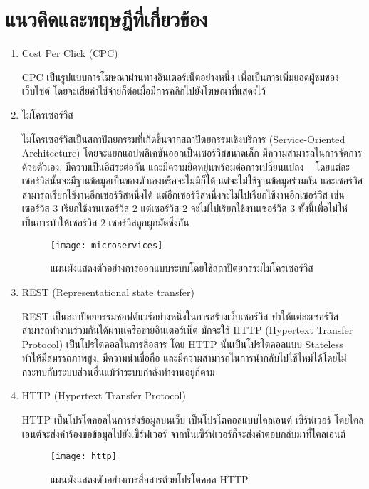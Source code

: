 \section{แนวคิดและทฤษฎีที่เกี่ยวข้อง}
\begin{enumerate}
	\item Cost Per Click (CPC)
	
	CPC เป็นรูปแบบการโฆษณาผ่านทางอินเตอร์เน็ตอย่างหนึ่ง เพื่อเป็นการเพิ่มยอดผู้ชมของเว็บไซต์  โดยจะเสียค่าใช้จ่ายก็ต่อเมื่อมีการคลิกไปยังโฆษณาที่แสดงไว้ ~\cite{cpc}
	
	\item ไมโครเซอร์วิส
	
	ไมโครเซอร์วิสเป็นสถาปัตยกรรมที่เกิดขึ้นจากสถาปัตยกรรมเชิงบริการ (Service-Oriented Architecture) โดยจะแยกแอปพลิเคชันออกเป็นเซอร์วิสขนาดเล็ก มีความสามารถในการจัดการด้วยตัวเอง, มีความเป็นอิสระต่อกัน และมีความยิดหยุ่นพร้อมต่อการเปลี่ยนแปลง ~\cite{microservices} โดยแต่ละเซอร์วิสนั้นจะมีฐานข้อมูลเป็นของตัวเองหรือจะไม่มีก็ได้ แต่จะไม่ใช้ฐานข้อมูลร่วมกัน และเซอร์วิสสามารถเรียกใช้งานอีกเซอร์วิสหนึ่งได้ แต่อีกเซอร์วิสหนึ่งจะไม่ไปเรียกใช้งานอีกเซอร์วิส เช่น เซอร์วิส 3 เรียกใช้งานเซอร์วิส 2 แต่เซอร์วิส 2 จะไม่ไปเรียกใช้งานเซอร์วิส 3 ทั้งนี้เพื่อไม่ให้เป็นการทำให้เซอร์วิส 2 เซอร์วิสถูกผูกมัดซึ่งกัน
	\begin{figure}[!h]
		\centering
		\texttt{[image: microservices]}  
		\caption{แผนผังแสดงตัวอย่างการออกแบบระบบโดยใช้สถาปัตยกรรมไมโครเซอร์วิส}
		\label{Fig:microservices}
	\end{figure}

	\item REST (Representational state transfer)

	REST เป็นสถาปัตยกรรมซอฟต์แวร์อย่างหนึ่งในการสร้างเว็บเซอร์วิส ทำให้แต่ละเซอร์วิสสามารถทำงานร่วมกันได้ผ่านเครือข่ายอินเตอร์เน็ต มักจะใช้ HTTP (Hypertext Transfer Protocol) เป็นโปรโตคอลในการสื่อสาร โดย HTTP นั้นเป็นโปรโตคอลแบบ Stateless ทำให้มีสมรรถภาพสูง, มีความน่าเชื่อถือ และมีความสามารถในการนำกลับไปใช้ใหม่ได้โดยไม่กระทบกับระบบส่วนอื่นแม้ว่าระบบกำลังทำงานอยู่ก็ตาม ~\cite{rest}
	
	\item HTTP (Hypertext Transfer Protocol)
	
	HTTP เป็นโปรโตคอลในการส่งข้อมูลบนเว็บ เป็นโปรโตคอลแบบไคลเอนต์-เซิร์ฟเวอร์ โดยไคลเอนต์จะส่งคำร้องขอข้อมูลไปยังเซิร์ฟเวอร์ จากนั้นเซิร์ฟเวอร์ก็จะส่งคำตอบกลับมาที่ไคลเอนต์ ~\cite{http}

	\begin{figure}[!h]
		\centering
		\texttt{[image: http]}  
		\caption{แผนผังแสดงตัวอย่างการสื่อสารด้วยโปรโตคอล HTTP}
		\label{Fig:http}
	\end{figure}


\end{enumerate}
